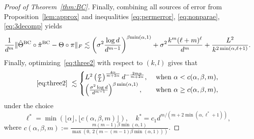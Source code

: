 \documentclass[12pt]{article}
\theoremstyle{definition}
\begin{document}
\begin{proof}[Proof of Theorem~\ref{thm:BC}]
Finally, combining all sources of error from Proposition~\ref{lem:approx} and inequalities \eqref{eq:permerror}, \eqref{eq:nonparae}, \eqref{eq:3decomp} yields
\begin{align}\label{eq:three2}
    \frac{1}{d^m} \lVert\hat\Theta^{\text{BC}}\circ \hat\pi^{\text{BC}}-\Theta\circ\pi\rVert_F\lesssim \left(\sigma^2{\log d\over d^{m-1}}\right)^{\beta{\min(\alpha,1)}}+ \sigma^2 \frac{k^m(\ell+m)^\ell}{d^m}+ \frac{L^2}{k^{2\min(\alpha,\ell+1)}}.
\end{align}
Finally, optimizing~\eqref{eq:three2} with respect to $(k,l)$ gives that 
\begin{align}
     \eqref{eq:three2}\ \lesssim 
     \begin{cases} 
    L^2\left({\sigma\over L}\right)^{4\alpha\over m+2\alpha} d^{-\frac{2m\alpha}{m+2\alpha}}, & \text{ when } \alpha <c(\alpha,\beta,m),\\
    \left( \sigma^2 \log d\over d^{m-1}\right)^{\beta\min(\alpha,1)}, &\text{ when } \alpha \geq c(\alpha,\beta,m),
    \end{cases}
\end{align}
under the choice
\[
\ell^* = \min\left(\lfloor\alpha\rfloor,\lfloor c(\alpha,\beta,m)\rfloor\right),\quad k^* = c_1d^{m/ (m+2\min(\alpha,\ell^*+1))},
\]
where $c(\alpha,\beta,m):= \frac{m(m-1)\beta\min(\alpha,1)}{\max(0,\ 2(m-(m-1)\beta\min(\alpha,1)))}$.

\end{proof}
\end{document}
